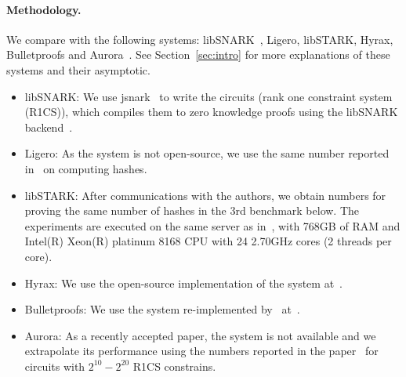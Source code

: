 \paragraph{Methodology.} We compare with the following systems: \textsf{libSNARK}~\cite{libsnark}, \textsf{Ligero}\cite{ligero}, \textsf{libSTARK}\cite{libstark}, \textsf{Hyrax}\cite{hyrax},  \textsf{Bulletproofs}\cite{bulletproofs} and \textsf{Aurora}~\cite{aurora}. See Section~\ref{sec:intro} for more explanations of these systems and their asymptotic. 
\begin{itemize}[leftmargin=*]
\item \textsf{libSNARK:} We use jsnark~\cite{jsnark} to write the circuits (rank one constraint system (R1CS)), which compiles them to zero knowledge proofs using the libSNARK backend~\cite{libsnark_impl}. 

\item\textsf{Ligero:} As the system is not open-source, we use the same number reported in~\cite{ligero} on computing hashes.

\item\textsf{libSTARK:} %
After communications with the authors, we obtain numbers for proving the same number of hashes in the 3rd benchmark below. The experiments are executed on the same server as in~\cite{libstark}, with 768GB of RAM and Intel(R) Xeon(R) platinum 8168 CPU with 24 2.70GHz cores (2 threads per core).


\item\textsf{Hyrax:} We use the open-source implementation of the system at~\cite{hyrax_impl}.

\item\textsf{Bulletproofs:} We use the system re-implemented by~\cite{hyrax} at~\cite{hyrax_impl}.


\item\textsf{Aurora:} As a recently accepted paper, the system is not available and we extrapolate its performance using the numbers reported in the paper~\cite{aurora} for circuits with $2^{10}-2^{20}$ R1CS constrains.

\end{itemize}


